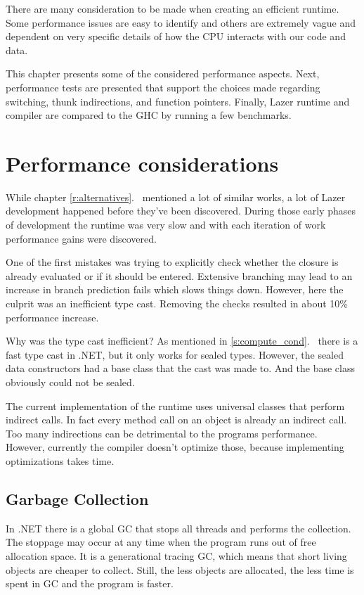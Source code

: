 \documentclass[en]{pracamgr}
\newcommand{\myref}[1]{\ref{#1}.~\textit{\nameref{#1}}}
\begin{document}
There are many consideration to be made when creating
an efficient runtime. Some performance issues are easy
to identify and others are extremely vague and dependent
on very specific details of how the CPU interacts with
our code and data.

This chapter presents some of the considered performance aspects.
Next, performance tests are presented that support the choices
made regarding switching, thunk indirections, and function pointers.
Finally, Lazer runtime and compiler are compared to the GHC by running
a few benchmarks.

\section{Performance considerations}

While chapter \myref{r:alternatives} mentioned a lot of similar
works, a lot of Lazer development happened before they've been
discovered. During those early phases of development the runtime
was very slow and with each iteration of work performance gains were
discovered.

One of the first mistakes was trying to explicitly check whether
the closure is already evaluated or if it should be entered.
Extensive branching may lead to an increase in branch
prediction fails which slows things down.
However, here the culprit was an inefficient type cast.
Removing the checks resulted in about 10\% performance increase.

Why was the type cast inefficient? As mentioned in \myref{s:compute_cond}
there is a fast type cast in .NET, but it only works for
sealed types. However, the sealed data constructors had a
base class that the cast was made to. And the base class
obviously could not be sealed.

The current implementation of the runtime uses universal
classes that perform indirect calls.
In fact every method call on an object is already an indirect call.
Too many indirections can be detrimental to the programs performance.
However, currently the compiler doesn't optimize those, because implementing
optimizations takes time.

\subsection{Garbage Collection}

In .NET there is a global GC that stops all threads
and performs the collection.
The stoppage may occur at any time when the program
runs out of free allocation space.
It is a generational tracing GC,
which means that short living objects are cheaper to collect.
Still, the less objects are allocated, the less time is
spent in GC and the program is faster.
\end{document}
